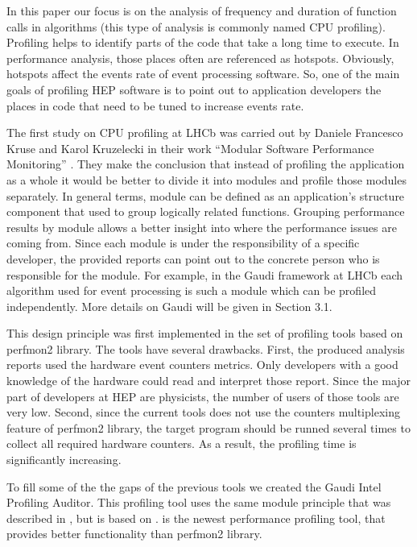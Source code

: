 \documentclass[a4paper]{jpconf}
\begin{document}
In this paper our focus is on the analysis of frequency and duration of function calls in algorithms (this type of 
analysis is commonly named CPU profiling). Profiling helps to identify parts of the code that take a long time to 
execute. In performance analysis, those places often are referenced as hotspots. Obviously,  hotspots affect the events 
rate of event processing software. So, one of the main goals of profiling HEP software is to point out to application 
developers the places in code that need to be tuned to increase events rate.

The first study on CPU profiling at LHCb was carried out by Daniele Francesco Kruse and Karol Kruzelecki in their work 
“Modular Software Performance Monitoring” \cite{modular}. They make the conclusion that instead of profiling 
the application as a whole it would be better to divide it into modules and profile those modules separately. 
In general terms,  module can be defined as an application’s structure component that used to group logically 
related functions.  Grouping performance results by module allows a better insight into where the performance 
issues are coming from. Since each module is under the responsibility of a specific developer,  the provided reports 
can point out to the concrete person who is responsible for the module. For example, in the Gaudi \cite{gaudi} 
framework at LHCb each algorithm used for event processing is such a module which can be profiled independently. 
More details on Gaudi will be given in Section 3.1. 

This design principle was first implemented in the set of profiling tools based on perfmon2 \cite{perfmon2} library.  
The tools have several drawbacks. First, the produced analysis reports  used the  hardware event counters metrics. 
Only developers with a good knowledge of the hardware could read and interpret those report. Since the major part of 
developers at HEP are physicists, the number of users of those tools are very low. Second, since the current tools 
does not use the counters multiplexing feature of perfmon2 library, the target program should be runned several times 
to collect all required hardware counters. As a result, the profiling time is significantly increasing.

To fill some of the the gaps of the previous tools we created the Gaudi Intel Profiling Auditor. This profiling tool 
uses the same module principle that was described in \cite{modular},  but is based on \iamp \cite{vtune}. 
\amp is the newest performance profiling tool, that provides better functionality than perfmon2 library. 
\end{document}
